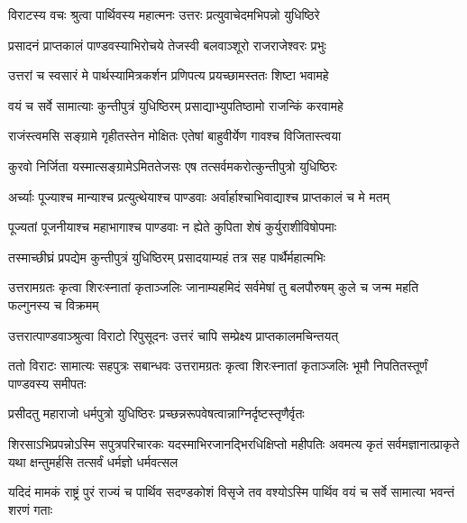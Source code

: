 \twolineshloka
{विराटस्य वचः श्रुत्वा पार्थिवस्य महात्मनः}
{उत्तरः प्रत्युवाचेदमभिपन्नो युधिष्ठिरे}


\twolineshloka
{प्रसादनं प्राप्तकालं पाण्डवस्याभिरोचये}
{तेजस्वी बलवाञ्शूरो राजराजेश्वरः प्रभुः}


\twolineshloka
{उत्तरां च स्वसारं मे पार्थस्यामित्रकर्शन}
{प्रणिपत्य प्रयच्छामस्ततः शिष्टा भवामहे}



\twolineshloka
{वयं च सर्वे सामात्याः कुन्तीपुत्रं युधिष्ठिरम्}
{प्रसाद्याभ्युपतिष्ठामो राजन्किं करवामहे}


\twolineshloka
{राजंस्त्वमसि सङ्ग्रामे गृहीतस्तेन मोक्षितः}
{एतेषां बाहुवीर्येण गावश्च विजितास्त्वया}


\twolineshloka
{कुरवो निर्जिता यस्मात्सङ्ग्रामेऽमिततेजसः}
{एष तत्सर्वमकरोत्कुन्तीपुत्रो युधिष्ठिरः}


\twolineshloka
{अर्च्याः पूज्याश्च मान्याश्च प्रत्युत्थेयाश्च पाण्डवाः}
{अर्वार्हाश्चाभिवाद्याश्च प्राप्तकालं च मे मतम्}


\twolineshloka
{पूज्यतां पूजनीयाश्च महाभागाश्च पाण्डवाः}
{न ह्येते कुपिता शेषं कुर्युराशीविषोपमाः}


\twolineshloka
{तस्माच्छीघ्रं प्रपद्येम कुन्तीपुत्रं युधिष्ठिरम्}
{प्रसादयाम्यहं तत्र सह पार्थैर्महात्मभिः}


\threelineshloka
{उत्तरामग्रतः कृत्वा शिरःस्नातां कृताञ्जलिः}
{जानाम्यहमिदं सर्वमेषां तु बलपौरुषम्}
{कुले च जन्म महति फल्गुनस्य च विक्रमम्}




\twolineshloka
{उत्तरात्पाण्डवाञ्श्रुत्वा विराटो रिपुसूदनः}
{उत्तरं चापि सम्प्रेक्ष्य प्राप्तकालमचिन्तयत्}


\threelineshloka
{ततो विराटः सामात्यः सहपुत्रः सबान्धवः}
{उत्तरामग्रतः कृत्वा शिरःस्नातां कृताञ्जलिः}
{भूमौ निपतितस्तूर्णं पाण्डवस्य समीपतः}




\twolineshloka
{प्रसीदतु महाराजो धर्मपुत्रो युधिष्ठिरः}
{प्रच्छन्नरूपवेषत्वान्नाग्निर्दृष्टस्तृणैर्वृतः}


\onelineshloka
{शिरसाऽभिप्रपन्नोऽस्मि सपुत्रपरिचारकः}
\threelineshloka
{यदस्माभिरजानद्भिरधिक्षिप्तो महीपतिः}
{अवमत्य कृतं सर्वमज्ञानात्प्राकृते यथा}
{क्षन्तुमर्हसि तत्सर्वं धर्मज्ञो धर्मवत्सल}


\threelineshloka
{यदिदं मामकं राष्ट्रं पुरं राज्यं च पार्थिव}
{सदण्डकोशं विसृजे तव वश्योऽस्मि पार्थिव}
{वयं च सर्वे सामात्या भवन्तं शरणं गताः}


